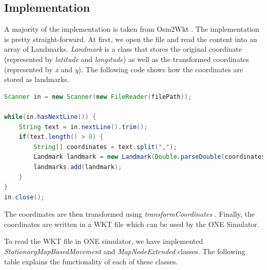 \subsection{Implementation}
A majority of the implementation is taken from Osm2Wkt \cite{mayer2010osm}. The implementation is pretty straight-forward. At first, we open the file and read the content into an array of Landmarks. \textit{Landmark} is a class that stores the original coordinate (represented by \textit{latitude} and \textit{longitude}) as well as the transformed coordinates (represented by \textit{x} and \textit{y}). The following code shows how the coordinates are stored as landmarks.
\begin{lstlisting}[language=java]
Scanner in = new Scanner(new FileReader(filePath));

while(in.hasNextLine()) {
	String text = in.nextLine().trim();
	if(text.length() > 0) {
		String[] coordinates = text.split(",");
		Landmark landmark = new Landmark(Double.parseDouble(coordinates[0]), Double.parseDouble(coordinates[1]));
		landmarks.add(landmark);
	}
}
in.close();
\end{lstlisting}
\vspace{2mm}
The coordinates are then transformed using \textit{transformCoordinates} \cite{mayer2010osm}. Finally, the coordinates are written in a WKT file which can be used by the ONE Simulator.\newline

To read the WKT file in ONE simulator, we have implemented \textit{StationaryMapBasedMovement} and \textit{MapNodeExtended} classes. The following table explains the functionality of each of these classes.

